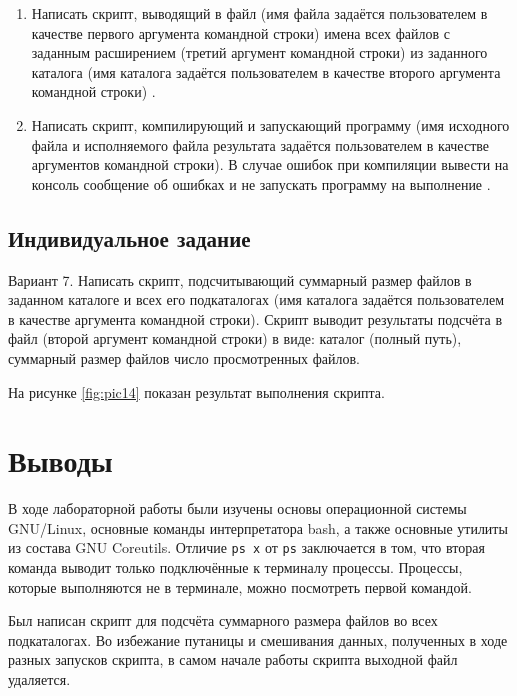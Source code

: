 \begin{enumerate}[listparindent=\fivecharsapprox]

	\item Написать скрипт, выводящий в файл (имя файла задаётся пользователем в качестве первого аргумента командной строки) имена всех файлов с заданным расширением (третий аргумент командной строки) из заданного каталога (имя каталога задаётся пользователем в качестве второго аргумента командной строки) .


	\item Написать скрипт, компилирующий и запускающий программу (имя исходного файла и исполняемого файла результата задаётся пользователем в качестве аргументов командной строки).
В случае ошибок при компиляции вывести на консоль сообщение об ошибках и не запускать программу на выполнение .


\end{enumerate}

\subsection{Индивидуальное задание}
\label{sec:job:personal_task}

Вариант 7. Написать скрипт, подсчитывающий суммарный размер файлов в заданном
каталоге и всех его подкаталогах (имя каталога задаётся пользователем в
качестве аргумента командной строки). Скрипт выводит результаты подсчёта
в файл (второй аргумент командной строки) в виде: каталог (полный путь),
суммарный размер файлов число просмотренных файлов.



На рисунке \ref{fig:pic14} показан результат выполнения скрипта.


\section{Выводы}
\label{sec:conclusion}

В ходе лабораторной работы были изучены основы операционной системы GNU/Linux, основные команды интерпретатора bash, а также основные утилиты из состава GNU Coreutils. Отличие \lstinline{ps x} от \lstinline{ps} заключается в том, что вторая команда выводит только подключённые к терминалу процессы. Процессы, которые выполняются не в терминале, можно посмотреть первой командой.

Был написан скрипт для подсчёта суммарного размера файлов во всех подкаталогах. Во избежание путаницы и смешивания данных, полученных в ходе разных запусков скрипта, в самом начале работы скрипта выходной файл удаляется.
